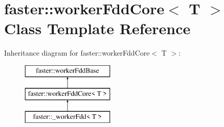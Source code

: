 \hypertarget{classfaster_1_1workerFddCore}{}\section{faster\+:\+:worker\+Fdd\+Core$<$ T $>$ Class Template Reference}
\label{classfaster_1_1workerFddCore}
Inheritance diagram for faster\+:\+:worker\+Fdd\+Core$<$ T $>$\+:\begin{figure}[H]
\begin{center}
\leavevmode
\includegraphics[height=3.000000cm]{classfaster_1_1workerFddCore}
\end{center}
\end{figure}
